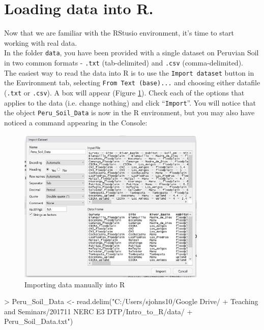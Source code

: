 \documentclass[a4paper,12pt]{article}
\begin{document}
\section{Loading data into R.}

Now that we are familiar with the RStusio environment, it's time to start working with real data. \\

In the folder \texttt{data}, you have been provided with a single dataset on Peruvian Soil in two common formats - \texttt{.txt} (tab-delimited) and \texttt{.csv} (comma-delimited). \\

The easiest way to read the data into R is to use the \texttt{Import dataset} button in the Environment tab, selecting \texttt{From Text (base)...} and choosing either datafile (\texttt{.txt} or \texttt{.csv}). A box will appear (Figure \ref{fig:Import_Dataset2}). Check each of the options that applies to the data (i.e. change nothing) and click ``\texttt{Import}''. You will notice that the object \texttt{Peru\_Soil\_Data} is now in the R environment, but you may also have noticed a command appearing in the Console: \\


\begin{figure}[t]
	\centering 
	\includegraphics[width=0.8\textwidth]{figs/Import_Dataset2.JPG}
	\caption{Importing data manually into R}
	\label{fig:Import_Dataset2}
\end{figure} 



\begin{shaded}
\begin{Schunk}
\begin{Sinput}
> Peru_Soil_Data <- read.delim("C:/Users/sjohns10/Google Drive/
+ Teaching and Seminars/201711 NERC E3 DTP/Intro_to_R/data/
+ Peru_Soil_Data.txt")
\end{Sinput}
\end{Schunk}
\end{shaded}
\end{document}
